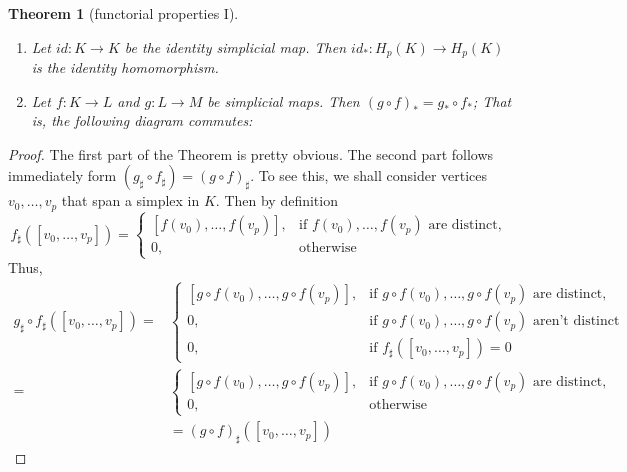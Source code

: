\documentclass[toc=bib]{scrartcl}
\theoremstyle{plain}
\newtheorem{theorem}{Theorem}[section]
\theoremstyle{definition}
\theoremstyle{remark}
\begin{document}
\begin{theorem}[functorial properties I]\label{func-prop1}\mbox{}
	\begin{enumerate}
		\item Let $id: K\to K$ be the identity simplicial map. Then $id_\ast: H_p(K)\to H_p(K)$ is the identity homomorphism.
		\item Let $f:K\to L$ and $g: L\to M$ be simplicial maps. Then $(g\circ f)_\ast=g_\ast\circ f_\ast$; That is, the following diagram commutes:
		
		\begin{center}
			
	\end{center}
	\end{enumerate}
\end{theorem}



\begin{proof}
	The first part of the Theorem is pretty obvious. The second part follows immediately form $(g_\sharp\circ f_\sharp)=(g\circ f)_\sharp$. To see this, we shall consider vertices $v_0,\dots,v_p$ that span a simplex in $K$.
	Then by definition 
	\[
	f_\sharp([v_0,\dots,v_p])=\begin{cases}
	[f(v_0),\dots,f(v_p)],& \text{if }f(v_0),\dots,f(v_p) \text{ are distinct},\\
	0,& \text{otherwise}
	\end{cases}
	\]
	Thus,
	\begin{align*}
	g_\sharp\circ f_\sharp([v_0,\dots,v_p])=&\begin{cases}
	[g\circ f(v_0),\dots,g\circ f(v_p)],& \text{if }g\circ f(v_0),\dots,g\circ f(v_p) \text{ are distinct},\\
	0,& \text{if }g\circ f(v_0),\dots,g\circ f(v_p) \text{ aren't distinct}\\
	0,& \text{if }f_\sharp([v_0,\dots,v_p])=0
	\end{cases}\\
	=&\begin{cases}
	[g\circ f(v_0),\dots,g\circ f(v_p)],& \text{if }g\circ f(v_0),\dots,g\circ f(v_p) \text{ are distinct},\\
		0,& \text{otherwise}
	\end{cases}\\
	&=(g\circ f)_\sharp([v_0,\dots,v_p])
	\end{align*}
\end{proof}
\end{document}
